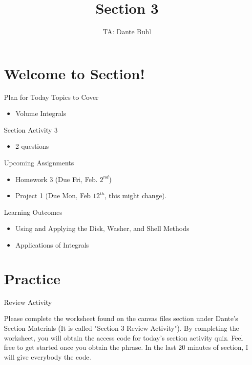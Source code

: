 \documentclass{beamer}
\title{Section 3}
\author{TA: Dante Buhl}
\institute{UCSC Math-19B}
\begin{document}
\newcommand{\bmp}[1]{\begin{minipage}{#1\textwidth}}
\newcommand{\emp}{\end{minipage}}


\frame{\titlepage}

\section{Welcome to Section!}
\begin{frame}{Plan for Today}
    Topics to Cover
    \begin{itemize}
        \item Volume Integrals
    \end{itemize}
    Section Activity 3
    \begin{itemize}
        \item 2 questions
    \end{itemize}
    Upcoming Assignments
    \begin{itemize}
        \item Homework 3 (Due Fri, Feb. $2^{nd}$)
        \item Project 1 (Due Mon, Feb $12^{th}$, this might change).
    \end{itemize}
\end{frame}



\begin{frame}{Learning Outcomes}
    \begin{itemize}
        \item Using and Applying the Disk, Washer, and Shell Methods
        \item Applications of Integrals
    \end{itemize}
\end{frame}

\section{Practice}
\begin{frame}{Review Activity}
    \raggedright
    Please complete the worksheet found on the canvas files section under Dante's Section Materials (It is called "Section 3 Review Activity"). By completing the worksheet, you will obtain the access code for today's section activity quiz. Feel free to get started once you obtain the phrase. In the last 20 minutes of section, I will give everybody the code. 
\end{frame}
\end{document}
